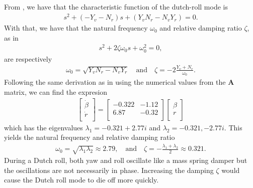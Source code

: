\subsection{}
From \cite{beard_mclain_2012}, we have that the characteristic function of the dutch-roll mode is
\begin{equation}\begin{aligned}
s^2 + (-Y_v - N_r)s + (Y_vN_r - N_vY_r) = 0.
\end{aligned}\end{equation}
With that, we have that the natural frequency $\omega_0$ and relative damping ratio $\zeta$, as in
\begin{equation}\begin{aligned}
s^2 + 2\zeta \omega_0 s + \omega_0^2 = 0,
\end{aligned}\end{equation}
are respectively
\begin{equation}\begin{aligned}
\label{eq:freqanddamp}
\omega_0 = \sqrt{Y_v N_r - N_v Y_r} \quad \text{and} \quad \zeta = -2\frac{Y_v + N_r}{\omega_0}.
\end{aligned}\end{equation}
Following the same derivation as in \cite{beard_mclain_2012} using the numerical values from the $\mathbf{A}$ matrix, we can find the expresion
\begin{equation}\begin{aligned}
\begin{bmatrix}
\dot \beta\\
\dot r\\
\end{bmatrix}
=
\begin{bmatrix}
-0.322 & -1.12 \\
6.87 & -0.32 \\
\end{bmatrix}
\begin{bmatrix}
\beta\\
r\\
\end{bmatrix}
\end{aligned}\end{equation}
which has the eigenvalues $\lambda_1 = -0.321 + 2.77i$ and $\lambda_2 = -0.321, - 2.77i$. This yields the natural frequency and relative damping ratio
\begin{equation}\begin{aligned}
\omega_0 = \sqrt{\lambda_1 \lambda_2} \approx 2.79, \quad \text{and} \quad \zeta = -\frac{\lambda_1 + \lambda_2}{2} \approx 0.321.
\end{aligned}\end{equation}
During a Dutch roll, both yaw and roll oscillate like a mass spring damper but the oscillations are not necessarily in phase. Increasing the damping $\zeta$ would cause the Dutch roll mode to die off more quickly.

